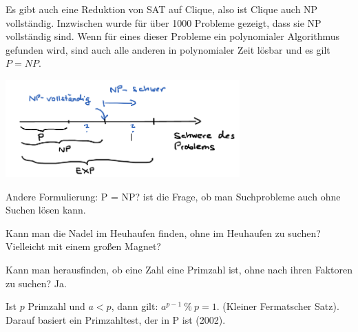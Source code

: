 \documentclass{beamer}
\begin{document}
\begin{frame}[fragile]
Es gibt auch eine Reduktion von SAT auf Clique, also ist Clique auch NP vollständig. Inzwischen wurde für über
1000 Probleme gezeigt, dass sie NP vollständig sind. Wenn für eines dieser Probleme ein polynomialer
Algorithmus gefunden wird, sind auch alle anderen in polynomialer Zeit lösbar und es gilt $P = NP$.

\includegraphics[width=9cm]{bild8.png}

\end{frame}

\begin{frame}[fragile]
Andere Formulierung: P = NP?  ist die Frage, ob man Suchprobleme auch ohne Suchen lösen kann. 

Kann man die Nadel im Heuhaufen finden, ohne im Heuhaufen zu suchen?  \pause Vielleicht mit einem großen Magnet?

Kann man herausfinden, ob eine Zahl eine Primzahl ist, ohne nach ihren Faktoren zu suchen?
\pause
Ja. \pause

Ist $p$ Primzahl und $a < p$, dann gilt: $a^{p-1}~\%~ p = 1$. (Kleiner Fermatscher Satz). Darauf basiert ein
Primzahltest, der in P ist (2002).




\end{frame}


 
\end{document}
